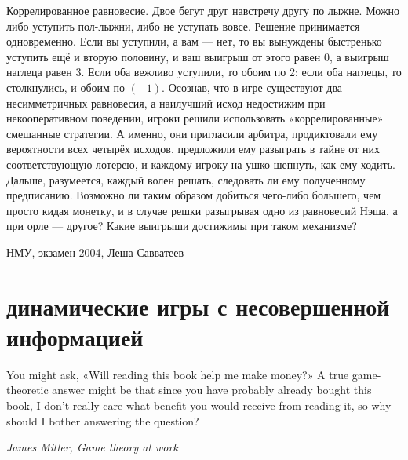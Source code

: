 \begin{problem}

Коррелированное равновесие. Двое бегут друг навстречу другу по лыжне. Можно либо уступить пол-лыжни, либо не уступать вовсе. Решение принимается одновременно. Если вы уступили, а вам — нет, то вы вынуждены
быстренько уступить ещё и вторую половину, и ваш выигрыш от этого равен 0, а выигрыш наглеца равен 3. Если оба вежливо уступили, то обоим по 2; если оба наглецы, то столкнулись, и обоим по $(-1)$.
Осознав, что в игре существуют два несимметричных равновесия, а наилучший исход недостижим при некооперативном поведении, игроки решили использовать «коррелированные» смешанные стратегии. А именно, они пригласили арбитра, продиктовали ему вероятности всех четырёх исходов, предложили ему разыграть в тайне от них соответствующую лотерею, и каждому игроку на ушко шепнуть, как ему ходить. Дальше, разумеется, каждый волен решать, следовать ли ему полученному предписанию.
Возможно ли таким образом добиться чего-либо большего, чем просто кидая монетку, и в случае решки разыгрывая одно из равновесий Нэша, а при орле — другое? Какие выигрыши достижимы при таком механизме?



\begin{source}
НМУ, экзамен 2004, Леша Савватеев
\end{source}


\begin{sol}

\end{sol}
\end{problem}






\section{динамические игры с несовершенной информацией}
%
You might ask, «Will reading this book help me make money?» A true game-theoretic answer might be that since you have probably already bought this book, I don't really care what benefit you would receive from reading it, so why should I bother answering the question?

{\it James Miller, Game theory at work}



